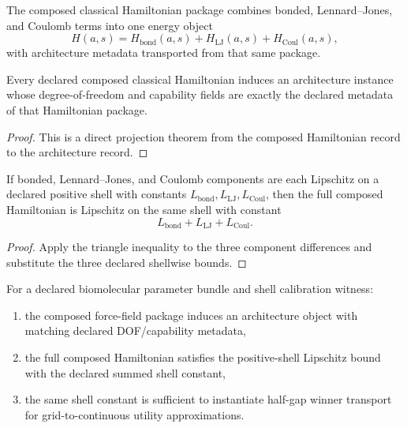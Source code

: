 The composed classical Hamiltonian package combines bonded, Lennard--Jones, and Coulomb terms into one energy object
\[
H(a,s)=H_{\mathrm{bond}}(a,s)+H_{\mathrm{LJ}}(a,s)+H_{\mathrm{Coul}}(a,s),
\]
with architecture metadata transported from that same package.

\begin{theorem}\label{thm:composed-hamiltonian-architecture-instance}
Every declared composed classical Hamiltonian induces an architecture instance whose degree-of-freedom and capability fields are exactly the declared metadata of that Hamiltonian package.
\end{theorem}

\begin{proof}
This is a direct projection theorem from the composed Hamiltonian record to the architecture record.
\end{proof}

\begin{theorem}\label{thm:composed-hamiltonian-lipschitz-bound}
If bonded, Lennard--Jones, and Coulomb components are each Lipschitz on a declared positive shell with constants $L_{\mathrm{bond}},L_{\mathrm{LJ}},L_{\mathrm{Coul}}$, then the full composed Hamiltonian is Lipschitz on the same shell with constant
\[
L_{\mathrm{bond}}+L_{\mathrm{LJ}}+L_{\mathrm{Coul}}.
\]
\end{theorem}

\begin{proof}
Apply the triangle inequality to the three component differences and substitute the three declared shellwise bounds.
\end{proof}

\begin{theorem}\label{thm:concrete-biomolecular-forcefield-calibration-bundle}
For a declared biomolecular parameter bundle and shell calibration witness:
\begin{enumerate}
\item the composed force-field package induces an architecture object with matching declared DOF/capability metadata,
\item the full composed Hamiltonian satisfies the positive-shell Lipschitz bound with the declared summed shell constant,
\item the same shell constant is sufficient to instantiate half-gap winner transport for grid-to-continuous utility approximations.
\end{enumerate}
\end{theorem}


